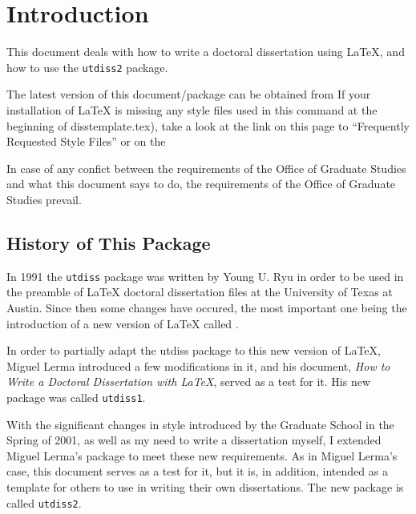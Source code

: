 \chapter{Introduction}
%


This document deals with how to write a doctoral dissertation 
using \LaTeX{}, and how to use the \texttt{utdiss2} package. 
%

The latest version of this document/package can be obtained from
If your installation of LaTeX is missing any style files used in this
command at the beginning of disstemplate.tex), take a look at the link
on this page to ``Frequently Requested Style Files'' or on the

In case of any confict between the requirements of the Office of Graduate
Studies and what this document says to do, the requirements of the Office
of Graduate Studies prevail.

\section{History of This Package}
%

In 1991 the \texttt{utdiss} package was written by Young U. Ryu 
%
in order to be used in the preamble of \LaTeX{} doctoral dissertation
files at the University of Texas at Austin. 
%
Since then some changes have occured, the most important one
being the introduction of a new version of \LaTeX{} 
%
called \LaTeXe{}. 
%

In order to partially adapt the utdiss package to this new version
of \LaTeX{}, Miguel Lerma introduced a few modifications in it,
and his document, \textit{How to Write a Doctoral Dissertation
with \LaTeX{}}, served as a test for it. His new package was
called \texttt{utdiss1}.
%

With the significant changes in style introduced by the Graduate
School in the Spring of 2001, as well as  my need to write a
dissertation myself, I extended Miguel Lerma's package to meet
these new requirements. As in Miguel Lerma's case, this document
serves as a test for it, but it is, in addition, intended as a
template for others to use in writing their own dissertations.
The new package is called \texttt{utdiss2}.
%

